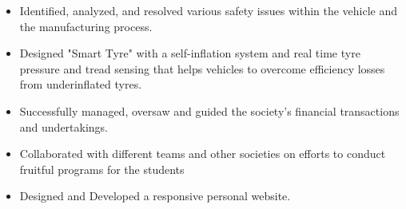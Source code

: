 \documentclass[10pt,a4paper]{altacv}
\begin{document}






\begin{itemize}
\item Identified, analyzed, and resolved various safety issues within the
vehicle and the manufacturing process.
\item  Designed "Smart Tyre" with a self-inflation system and real time tyre
pressure and tread sensing that helps vehicles to overcome efficiency
losses from underinflated tyres.
\end{itemize}


\divider

\begin{itemize}
\item Successfully managed, oversaw and guided the society’s financial
transactions and undertakings.
\item  Collaborated with different teams and other societies on efforts to
conduct fruitful programs for the students
\end{itemize}

\divider
{}


\begin{itemize}
    \item Designed and Developed a responsive personal website.
\end{itemize}


\divider
\end{document}

